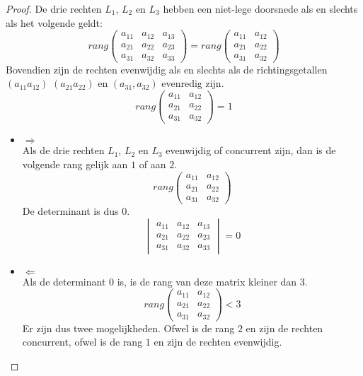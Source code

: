 \documentclass[main.tex]{subfiles}
\begin{document}
\begin{lem}
  \begin{proof}
    De drie rechten $L_{1}$, $L_{2}$ en $L_{3}$ hebben een niet-lege doorsnede als en slechts als het volgende geldt:
    \[
    rang
    \left(
    \begin{array}{cc|c}
    a_{11} & a_{12} & a_{13}\\
    a_{21} & a_{22} & a_{23}\\
    a_{31} & a_{32} & a_{33}
    \end{array}
    \right)
    =
    rang
    \begin{pmatrix}
    a_{11} & a_{12}\\
    a_{21} & a_{22}\\
    a_{31} & a_{32}
    \end{pmatrix}
    \]
    Bovendien zijn de rechten evenwijdig als en slechts als de richtingsgetallen $(a_{11} a_{12})$ $(a_{21} a_{22})$ en $(a_{31}, a_{32})$ evenredig zijn.
    \[
    rang
    \begin{pmatrix}
    a_{11} & a_{12}\\
    a_{21} & a_{22}\\
    a_{31} & a_{32}
    \end{pmatrix}
    = 1
    \]
    \begin{itemize}
    \item $\Rightarrow$\\
      Als de drie rechten $L_{1}$, $L_{2}$ en $L_{3}$ evenwijdig of concurrent zijn, dan is de volgende rang gelijk aan $1$ of aan $2$. 
      \[
      rang
      \begin{pmatrix}
        a_{11} & a_{12}\\
        a_{21} & a_{22}\\
        a_{31} & a_{32}
      \end{pmatrix}
      \]
      De determinant is dus $0$.
      \[
      \begin{vmatrix}
        a_{11} & a_{12} & a_{13}\\
        a_{21} & a_{22} & a_{23}\\
        a_{31} & a_{32} & a_{33}
      \end{vmatrix}
      = 0
      \]
    \item $\Leftarrow$\\
      Als de determinant $0$ is, is de rang van deze matrix kleiner dan $3$.
      \[
      rang
      \begin{pmatrix}
        a_{11} & a_{12}\\
        a_{21} & a_{22}\\
        a_{31} & a_{32}
      \end{pmatrix}
      < 3
      \]
      Er zijn dus twee mogelijkheden. Ofwel is de rang $2$ en zijn de rechten concurrent, ofwel is de rang $1$ en zijn de rechten evenwijdig.
    \end{itemize}
  \end{proof}
\end{lem}
\end{document}
